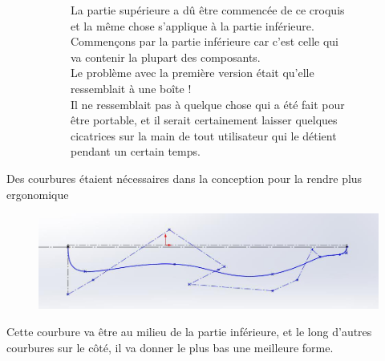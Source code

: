 \begin{figure}
\begin{subfigure}[m]{.65\linewidth}
    \end{subfigure}
    \hfill
    \begin{subfigure}[m]{.3\linewidth}
        La partie supérieure a dû être commencée de ce croquis et la même chose s’applique à la partie inférieure. \\
        Commençons par la partie inférieure car c’est celle qui va contenir la plupart des composants. \\
        Le problème avec la première version était qu’elle ressemblait à une boîte ! \\
        Il ne ressemblait pas à quelque chose qui a été fait pour être portable, et il serait certainement laisser quelques cicatrices sur la main de tout utilisateur qui le détient pendant un certain temps.
    \end{subfigure}
\end{figure}

\FloatBarrier

Des courbures étaient nécessaires dans la conception pour la rendre plus ergonomique

\begin{figure}[!htbp]
    \centering
    \includegraphics[width=.9\linewidth]{assets/conception1/img169.jpg}
\end{figure}

Cette courbure va être au milieu de la partie inférieure, et le long d’autres courbures sur le côté, il va donner le plus bas une meilleure forme.

